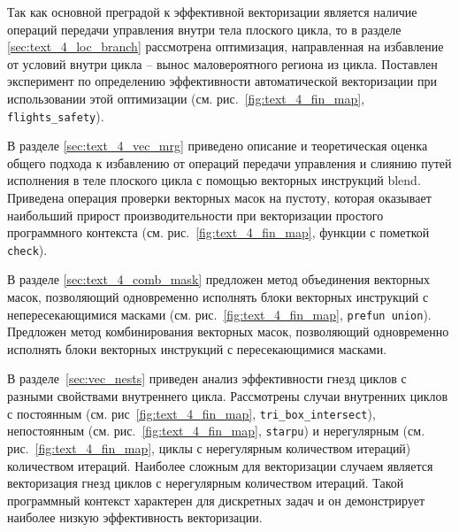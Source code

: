 Так как основной преградой к эффективной векторизации является наличие операций передачи управления внутри тела плоского цикла, то в разделе \ref{sec:text_4_loc_branch} рассмотрена оптимизация, направленная на избавление от условий внутри цикла -- вынос маловероятного региона из цикла.
Поставлен эксперимент по определению эффективности автоматической векторизации при использовании этой оптимизации (см. рис.~\ref{fig:text_4_fin_map}, \texttt{flights\_safety}).

В разделе \ref{sec:text_4_vec_mrg} приведено описание и теоретическая оценка общего подхода к избавлению от операций передачи управления и слиянию путей исполнения в теле плоского цикла с помощью векторных инструкций blend.
Приведена операция проверки векторных масок на пустоту, которая оказывает наибольший прирост производительности при векторизации простого программного контекста (см. рис.~\ref{fig:text_4_fin_map}, функции с пометкой \texttt{check}).

В разделе \ref{sec:text_4_comb_mask} предложен метод объединения векторных масок, позволяющий одновременно исполнять блоки векторных инструкций с непересекающимися масками (см. рис.~\ref{fig:text_4_fin_map}, \texttt{prefun union}).
Предложен метод комбинирования векторных масок, позволяющий одновременно исполнять блоки векторных инструкций с пересекающимися масками.

В разделе~\ref{sec:vec_nests} приведен анализ эффективности гнезд циклов с разными свойствами внутреннего цикла.
Рассмотрены случаи внутренних циклов с постоянным (см. рис~\ref{fig:text_4_fin_map}, \texttt{tri\_box\_intersect}), непостоянным (см. рис.~\ref{fig:text_4_fin_map}, \texttt{starpu}) и нерегулярным (см. рис.~\ref{fig:text_4_fin_map}, циклы с нерегулярным количеством итераций) количеством итераций.
Наиболее сложным для векторизации случаем является векторизация гнезд циклов с нерегулярным количеством итераций.
Такой программный контекст характерен для дискретных задач и он демонстрирует наиболее низкую эффективность векторизации.

